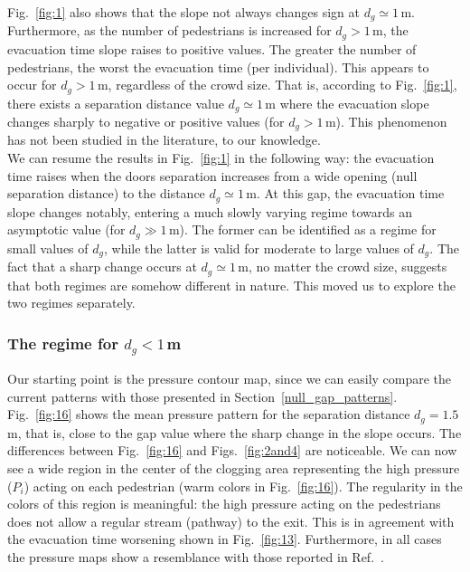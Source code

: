 Fig.~\ref{fig:1} also shows that the slope not always changes sign  
at $d_g\simeq1\,$m. Furthermore, as the number of pedestrians is increased for 
$d_g>1\,$m, the evacuation time slope raises to positive values. The 
greater the number of pedestrians, the worst the evacuation time (per 
individual). This appears to occur for $d_g>1\,$m, regardless of the crowd 
size. That is, according to Fig.~\ref{fig:1}, there exists a separation 
distance value $d_g\simeq1\,$m where the evacuation slope changes sharply 
to negative or positive values (for $d_g>1\,$m). This phenomenon has not been 
studied in the literature, to our knowledge. \\

We can resume the results in Fig.~\ref{fig:1} in the following way: the 
evacuation time raises when the doors separation increases from a wide opening 
(null separation distance) to the distance $d_g\simeq1\,$m. At this gap, the 
evacuation time slope changes notably, entering a much slowly 
varying regime towards an asymptotic value (for $d_g\gg1\,$m).  The former can 
be identified as a regime for small values of $d_g$, while the latter is valid 
for moderate to large values of $d_g$. The fact that a sharp change occurs at 
$d_g\simeq1\,$m, no matter the crowd size, suggests that both regimes are 
somehow different in nature. This moved us to explore the two regimes 
separately. \\

\subsubsection{\label{small_regime} The regime for $d_g<1\,$m}

Our starting point is the pressure contour map, since we can easily compare the 
current patterns with those presented in Section~\ref{null_gap_patterns}. 
Fig.~\ref{fig:16} shows the mean pressure pattern for the separation distance 
$d_g=1.5\,$m, that is, close to the gap value where the sharp change in the 
slope occurs. The differences between Fig.~\ref{fig:16} and 
Figs.~\ref{fig:2and4} are noticeable. We can now see a wide region in the center of 
the clogging area representing the high pressure ($P_i$) acting 
on each pedestrian (warm colors in Fig.~\ref{fig:16}). The regularity in the 
colors of this region is meaningful: the high pressure acting on the pedestrians 
does not allow a regular stream (pathway) to the exit. This is in agreement with 
the evacuation time worsening shown in Fig.~\ref{fig:13}. {\color{red} Furthermore, in all cases the pressure maps show a resemblance with those reported in Ref.~\cite{Zhang}.}\\

